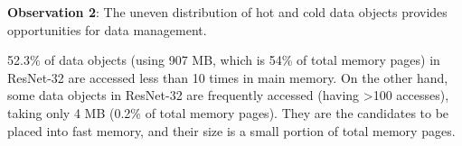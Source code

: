 \textbf{Observation 2}: The uneven distribution of hot and cold data objects provides opportunities for data management. 

\textcolor{check}{
52.3\% of data objects (using 907 MB, which is 54\% of total memory pages) in ResNet-32 are accessed less than 10 times in main memory. On the other hand, some data objects in ResNet-32 are frequently accessed (having >100 accesses), taking only 4 MB (0.2\% of total memory pages). They are the candidates to be placed into fast memory, and their size is a small portion of total memory pages. }


